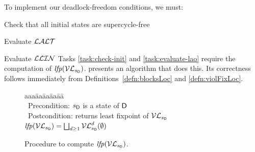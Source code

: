 To implement our deadlock-freedom conditions, we must:
\bn
\item \label{task:check-init} Check that all initial states are supercycle-free
\item \label{task:evaluate-lao} Evaluate $\mathcal{LALT}$
\item \label{task:evaluate-llin} Evaluate $\mathcal{LLIN}$
\en
%
Tasks \ref{task:check-init} and \ref{task:evaluate-lao} require the computation of $\mathit{lfp}(\mathcal{VL}_{s_\mathsf{D}})$.
 presents an algorithm that does this. Its
correctness follows immediately from 
Definitions~\ref{defn:blocksLoc} and \ref{defn:violFixLoc}.

   \label{secn:computeLFP}
%   

\newcommand{\fpt}{\mathit{fixpoint}}
\newcommand{\VLA}[5]{\ensuremath{\MATHIDN{V_{\dsk{#1}{#2},#3} [#4 #5]}}}    %

\begin{figure}[H]
\setcounter{lctr}{0}
\begin{tabbing}\label{alg:compute-lfp}
aaa\= aa\= aa\= aa\= aa\=\kill
\cLFP{$\dsk{\act}{\l},\sD$}\\
\cmnt\ Precondition: $s_\mathsf{D}$ is a state of $\mathsf{D}$\\
\cmnt\ Postcondition: returns least fixpoint of $\mathcal{VL}_{s_\mathsf{D}}$ \ie $\mathit{lfp}(\mathcal{VL}_{s_\mathsf{D}}) = \bigsqcup_{d \ge 1} \mathcal{VL}_{s_\mathsf{D}}^{d}(\emptyset)$\\

\lio{\XS \gts \ewfg;}

\lio{\WHILEC{\true}}
   \lit{\YS \gts \cVL{\dsk{\act}{\l}, \sD, \XS};}
\lion{\ENDWHILE}
\end{tabbing}
\caption{Procedure to compute $\mathit{lfp}(\mathcal{VL}_{s_\mathsf{D}})$.}
\label{fig:algcomputeLFP}
\end{figure}




